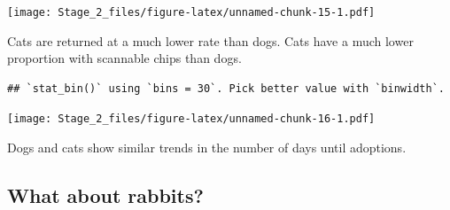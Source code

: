 \documentclass[]{article}
\newenvironment{Shaded}{\begin{snugshade}}{\end{snugshade}}
\newcommand{\KeywordTok}[1]{\textcolor[rgb]{0.13,0.29,0.53}{\textbf{#1}}}
\newcommand{\DataTypeTok}[1]{\textcolor[rgb]{0.13,0.29,0.53}{#1}}
\newcommand{\DecValTok}[1]{\textcolor[rgb]{0.00,0.00,0.81}{#1}}
\newcommand{\StringTok}[1]{\textcolor[rgb]{0.31,0.60,0.02}{#1}}
\newcommand{\OtherTok}[1]{\textcolor[rgb]{0.56,0.35,0.01}{#1}}
\newcommand{\OperatorTok}[1]{\textcolor[rgb]{0.81,0.36,0.00}{\textbf{#1}}}
\newcommand{\NormalTok}[1]{#1}
\begin{document}
\texttt{[image: Stage\_2\_files/figure-latex/unnamed-chunk-15-1.pdf]}

Cats are returned at a much lower rate than dogs. Cats have a much lower
proportion with scannable chips than dogs.

\begin{Shaded}
\end{Shaded}

\begin{verbatim}
## `stat_bin()` using `bins = 30`. Pick better value with `binwidth`.
\end{verbatim}

\texttt{[image: Stage\_2\_files/figure-latex/unnamed-chunk-16-1.pdf]}

Dogs and cats show similar trends in the number of days until adoptions.

\subsection{What about rabbits?}\label{what-about-rabbits}

\begin{Shaded}
\end{Shaded}
\end{document}
